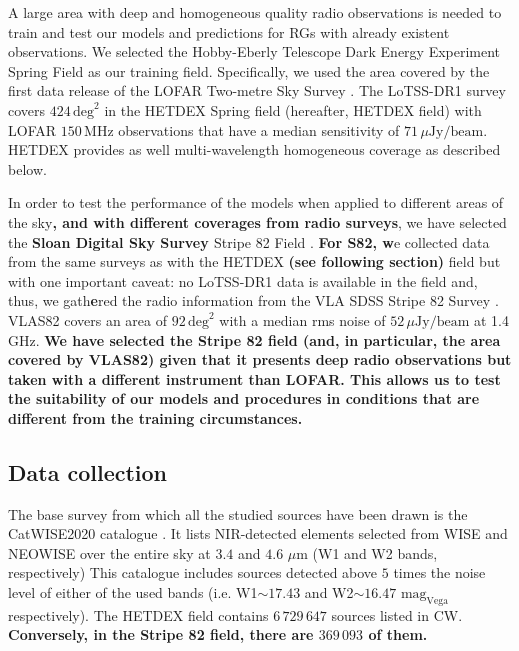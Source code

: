 \documentclass{aa}
\begin{document}
A large area with deep and homogeneous quality radio observations is needed to train and test our models and predictions for RGs with already existent observations. We selected the Hobby-Eberly Telescope Dark Energy Experiment Spring Field \citep[HETDEX;][]{2008ASPC..399..115H} as our training field. Specifically, we used the area covered by the first data release of the LOFAR Two-metre Sky Survey \citep[LoTSS-DR1;][]{2019A&A...622A...1S}. The LoTSS-DR1 survey covers $424\, \mathrm{deg}^{2}$ in the HETDEX Spring field (hereafter, HETDEX field) with LOFAR \citep{2013A&A...556A...2V} $150\, \mathrm{MHz}$ observations that have a median sensitivity of $71\, \mu\mathrm{Jy}/\mathrm{beam}$. HETDEX provides as well multi-wavelength homogeneous coverage as described below.

In order to test the performance of the models when applied to different areas of the sky\textbf{, and with different coverages from radio surveys}, we have selected the \textbf{Sloan Digital Sky Survey \citep[SDSS,][]{2000AJ....120.1579Y}} Stripe 82 Field \textbf{\citep[S82. For a description of the field, see][]{2014ApJ...794..120A, 2014ApJS..213...12J}}. 
\textbf{For S82, w}e collected data from the same surveys as with the HETDEX \textbf{(see following section)} field but with one important caveat: no LoTSS-DR1 data is available in the field and, thus, we gath\textbf{e}red the radio information from the VLA SDSS Stripe 82 Survey \citep[VLAS82;][]{2011AJ....142....3H}. VLAS82 covers an area of $92\, \mathrm{deg}^{2}$ with a median rms noise of $52\,\mu\mathrm{Jy}/\mathrm{beam}$ at 1.4$\,$GHz. \textbf{We have selected the Stripe 82 field (and, in particular, the area covered by VLAS82) given that it presents deep radio observations but taken with a different instrument than LOFAR. This allows us to test the suitability of our models and procedures in conditions that are different from the training circumstances.}


\subsection{Data collection}\label{sec:data_collection}

The base survey from which all the studied sources have been drawn is the CatWISE2020 catalogue \citep[CW;][]{2021ApJS..253....8M}. It lists NIR-detected elements selected from WISE \citep{2010AJ....140.1868W} and NEOWISE \citep{2011ApJ...731...53M, 2014ApJ...792...30M} over the entire sky at $3.4$ and $4.6$ $\mu$m (W1 and W2 bands, respectively) This catalogue includes sources detected above $5$ times the noise level of either of the used bands (i.e. W1${\sim} 17.43$ and W2${\sim} 16.47$ $\mathrm{mag}_{\mathrm{Vega}}$ respectively). The HETDEX field contains $6\,729\,647$ sources listed in CW. \textbf{Conversely, in the Stripe 82 field, there are $369\,093$ of them.}
\end{document}
